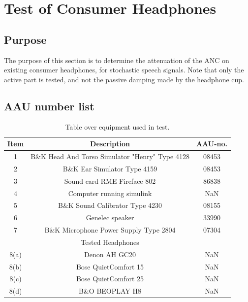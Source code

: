 
\section{Test of Consumer Headphones}
\subsection{Purpose}
The purpose of this section is to determine the attenuation of the ANC on existing consumer headphones, for stochastic speech signals. 
Note that only the active part is tested, and not the passive damping made by the headphone cup.


\subsection{AAU number list}
\begin{table}[H]
	\centering
	\begin{tabular}{ c c c } \toprule
	{Item}	&	{Description} 								& {AAU-no}. \\ 
								\bottomrule 
		1	&	B\&K Head And Torso Simulator "Henry" Type 4128	& 08453	\\
		2	&	B\&K Ear Simulator Type 4159				& 08453		\\
		3	&	Sound card RME Fireface 802					& 86838		\\
		4	&	Computer running simulink					& NaN		\\
		5	&	B\&K Sound Calibrator Type 4230				& 08155		\\ 
		6	&	Genelec speaker								& 33990		\\ 
		7	& 	B\&K Microphone Power Supply Type 2804		& 07304		\\
								\bottomrule
							& Tested Headphones 			& 			\\
								\bottomrule
		8(a)	& Denon AH GC20 								& NaN 		\\
		8(b)	& Bose QuietComfort 15 							& NaN 		\\
		8(c)	& Bose QuietComfort 25						 	& NaN		\\
		8(d)	& B\&O BEOPLAY H8 								& NaN		\\
								\bottomrule
	\end{tabular}
	\caption{Table over equipment used in test.}
	\label{tab:UsedEquipmentListConsumerHP}
\end{table}

